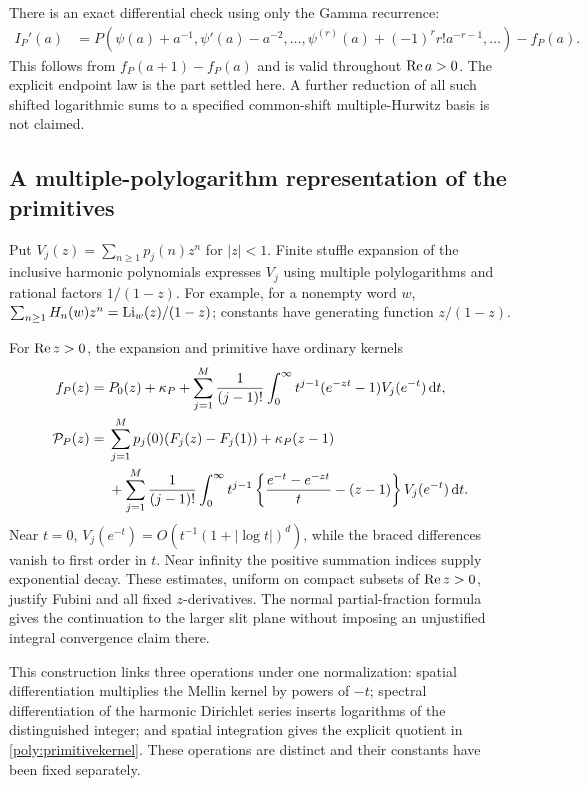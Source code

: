 There is an exact differential check using only the Gamma recurrence:
\begin{align}\label{poly:shiftdifferential}
 I_P'(a)&=P\left(\psi(a)+a^{-1},
 \psi'(a)-a^{-2},\ldots,
 \psi^{(r)}(a)+(-1)^rr!a^{-r-1},\ldots\right)
               -f_P(a).
\end{align}
This follows from $f_P(a+1)-f_P(a)$ and is valid throughout
$\operatorname{Re} a>0$. The explicit endpoint law is the part settled here.
A further reduction of all such shifted logarithmic sums to a specified
common-shift multiple-Hurwitz basis is not claimed.

\subsection{A multiple-polylogarithm representation of the primitives}

Put $V_j(z)=\sum_{n\ge1}p_j(n)z^n$ for $|z|<1$. Finite stuffle
expansion of the inclusive harmonic polynomials expresses $V_j$ using
multiple polylogarithms and rational factors $1/(1-z)$.
For example, for a nonempty word $w$,
$\sum_{n\ge1}H_n(w)z^n=\operatorname{Li}_w(z)/(1-z)$; constants have
generating function $z/(1-z)$.

For $\operatorname{Re} z>0$, the expansion and primitive have ordinary kernels
\begin{align}\label{poly:MLkernel}
 f_P(z)={}&P_0(z)+\kappa_P+
 \sum_{j=1}^M\frac1{(j-1)!}
 \int_0^\infty t^{j-1}(e^{-zt}-1)V_j(e^{-t})\,\mathrm d t,\\
 \mathcal P_P(z)={}&\sum_{j=1}^Mp_j(0)(F_j(z)-F_j(1))
 +\kappa_P(z-1)\notag\\
 &+\sum_{j=1}^M\frac1{(j-1)!}
 \int_0^\infty t^{j-1}
 \left\{\frac{e^{-t}-e^{-zt}}t-(z-1)\right\}
 V_j(e^{-t})\,\mathrm d t.\label{poly:primitivekernel}
\end{align}
Near $t=0$, $V_j(e^{-t})=O(t^{-1}(1+|\log t|)^d)$, while the
braced differences vanish to first order in $t$. Near infinity the
positive summation indices supply exponential decay. These estimates,
uniform on compact subsets of $\operatorname{Re} z>0$, justify Fubini and all fixed
$z$-derivatives. The normal partial-fraction formula gives the continuation
to the larger slit plane without imposing an unjustified integral
convergence claim there.

This construction links three operations under one normalization:
spatial differentiation multiplies the Mellin kernel by powers of $-t$;
spectral differentiation of the harmonic Dirichlet series inserts
logarithms of the distinguished integer; and spatial integration gives
the explicit quotient in \eqref{poly:primitivekernel}. These operations
are distinct and their constants have been fixed separately.
